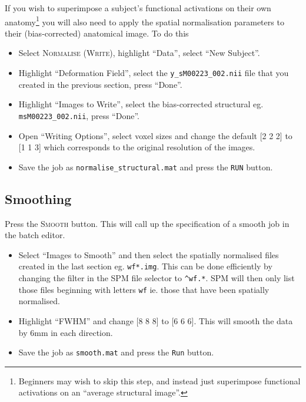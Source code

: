 If you wish to superimpose a subject's functional activations on their own anatomy\footnote{Beginners may wish to skip this step, and instead just superimpose functional activations on an ``average structural image''.} you will also need to apply the spatial normalisation parameters to their (bias-corrected) anatomical image. To do this

\begin{itemize}
\item Select \textsc{Normalise (Write)}, highlight ``Data'', select ``New Subject''.
\item Highlight ``Deformation Field'', select the  \texttt{y\_sM00223\_002.nii} file that you created in the previous section, press ``Done''.
\item Highlight ``Images to Write'', select the bias-corrected structural eg. \texttt{msM00223\_002.nii}, press ``Done''.
\item Open ``Writing Options'', select voxel sizes and change the default [2 2 2] to [1 1 3] which corresponds to the original resolution of the images.
\item Save the job as \texttt{normalise\_structural.mat} and press the \texttt{RUN} button.
\end{itemize}

\subsection{Smoothing}

Press the \textsc{Smooth} button. This will call up the specification of a smooth job in the batch editor.

\begin{itemize}
\item Select ``Images to Smooth'' and then select the spatially normalised files created in the last section eg. \texttt{wf*.img}. This can be done efficiently by changing the filter in the SPM file selector to \texttt{\textasciicircum wf.*}. SPM will then only list those files beginning with letters \texttt{wf} ie. those that have been spatially normalised.
\item Highlight ``FWHM'' and change [8 8 8] to [6 6 6]. This will smooth the data by 6mm in each direction.
\item Save the job as \texttt{smooth.mat} and press the \texttt{Run} button.
\end{itemize}

